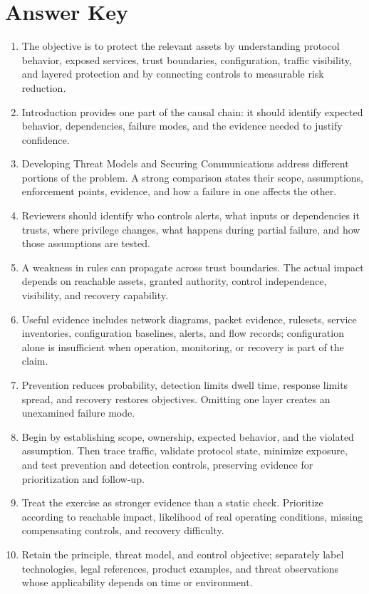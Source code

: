 \documentclass[11pt,letterpaper]{article}
\begin{document}
\section*{Answer Key}
\begin{enumerate}
\item The objective is to protect the relevant assets by understanding protocol behavior, exposed services, trust boundaries, configuration, traffic visibility, and layered protection and by connecting controls to measurable risk reduction.
\item Introduction provides one part of the causal chain: it should identify expected behavior, dependencies, failure modes, and the evidence needed to justify confidence.
\item Developing Threat Models and Securing Communications address different portions of the problem. A strong comparison states their scope, assumptions, enforcement points, evidence, and how a failure in one affects the other.
\item Reviewers should identify who controls alerts, what inputs or dependencies it trusts, where privilege changes, what happens during partial failure, and how those assumptions are tested.
\item A weakness in rules can propagate across trust boundaries. The actual impact depends on reachable assets, granted authority, control independence, visibility, and recovery capability.
\item Useful evidence includes network diagrams, packet evidence, rulesets, service inventories, configuration baselines, alerts, and flow records; configuration alone is insufficient when operation, monitoring, or recovery is part of the claim.
\item Prevention reduces probability, detection limits dwell time, response limits spread, and recovery restores objectives. Omitting one layer creates an unexamined failure mode.
\item Begin by establishing scope, ownership, expected behavior, and the violated assumption. Then trace traffic, validate protocol state, minimize exposure, and test prevention and detection controls, preserving evidence for prioritization and follow-up.
\item Treat the exercise as stronger evidence than a static check. Prioritize according to reachable impact, likelihood of real operating conditions, missing compensating controls, and recovery difficulty.
\item Retain the principle, threat model, and control objective; separately label technologies, legal references, product examples, and threat observations whose applicability depends on time or environment.
\end{enumerate}
\end{document}
